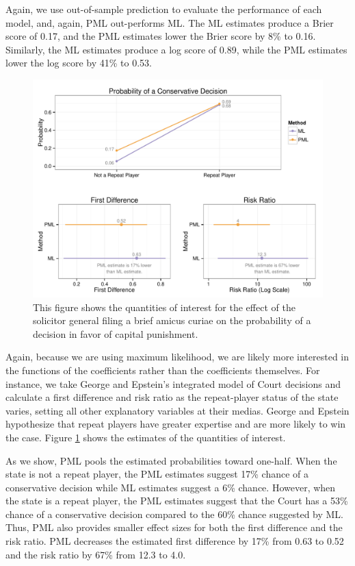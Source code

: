 \documentclass[12pt]{article}
\begin{document}
Again, we use out-of-sample prediction to evaluate the performance of each model, and, again, PML out-performs ML.
The ML estimates produce a Brier score of 0.17, and the PML estimates lower the Brier score by 8\% to 0.16. 
Similarly, the ML estimates produce a log score of 0.89, while the PML estimates lower the log score by 41\% to 0.53. 

\begin{figure}[h]
\begin{center}
\includegraphics[width = \textwidth]{figs/ge-qis.pdf}
\caption{This figure shows the quantities of interest for the effect of the solicitor general filing a brief amicus curiae on the probability of a decision in favor of capital punishment.}\label{fig:ge-qis}
\end{center}
\end{figure}

Again, because we are using maximum likelihood, we are likely more interested in the functions of the coefficients rather than the coefficients themselves. 
For instance, we take George and Epstein's integrated model of Court decisions and calculate a first difference and risk ratio as the repeat-player status of the state varies, setting all other explanatory variables at their medias.
George and Epstein hypothesize that repeat players have greater expertise and are more likely to win the case.
Figure \ref{fig:ge-qis} shows the estimates of the quantities of interest.

As we show, PML pools the estimated probabilities toward one-half. When the state is not a repeat player, the PML estimates suggest 17\% chance of a conservative decision while ML estimates suggest a 6\% chance. 
However, when the state is a repeat player, the PML estimates suggest that the Court has a 53\% chance of a conservative decision compared to the 60\% chance suggested by ML. 
Thus, PML also provides smaller effect sizes for both the first difference and the risk ratio. 
PML decreases the estimated first difference by 17\% from 0.63 to 0.52 and the risk ratio by 67\% from 12.3 to 4.0. 
\end{document}
